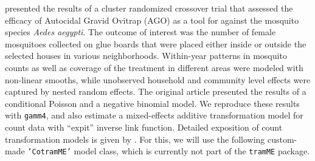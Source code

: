 \documentclass[11pt]{article}\usepackage[]{graphicx}\usepackage{xcolor}
\newcommand{\pkg}[1]{\texttt{#1}}
\newcommand{\0}{{\mathbf{0}}}
\begin{document}
\citet{Juarez_2021} presented the results of a cluster randomized crossover trial
that assessed the efficacy of Autocidal Gravid Ovitrap (AGO)
as a tool for against the mosquito species \emph{Aedes aegypti}.
The outcome of interest was the number of female mosquitoes
collected on glue boards that were placed either inside or outside
the selected houses in various neighborhoods.
Within-year patterns in mosquito counts as well as coverage of the treatment in
different areas were modeled with non-linear smooths,
while unobserved household and community level effects
were captured by nested random effects.
The original article presented the results
of a conditional Poisson and a negative binomial model.
We reproduce these results with \pkg{gamm4},
and also estimate a mixed-effects additive transformation model
for count data with ``expit'' inverse link function.
Detailed exposition of count transformation models
is given by \citet{Siegfried_Hothorn_2020}.
For this, we will use the following custom-made
\texttt{'CotramME'} model class,
which is currently not part of the \pkg{tramME} package.
%
\end{document}
